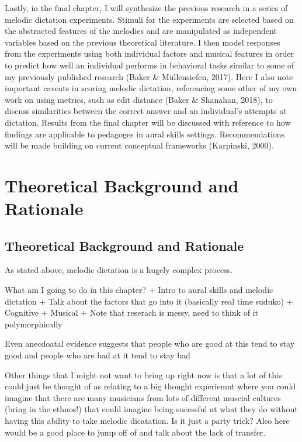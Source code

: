 \documentclass[]{book}
\theoremstyle{definition}
\theoremstyle{definition}
\theoremstyle{definition}
\theoremstyle{remark}
\begin{document}
Lastly, in the final chapter, I will synthesize the previous research in
a series of melodic dictation experiments. Stimuli for the experiments
are selected based on the abstracted features of the melodies and are
manipulated as independent variables based on the previous theoretical
literature. I then model responses from the experiments using both
individual factors and musical features in order to predict how well an
individual performs in behavioral tasks similar to some of my previously
published research (Baker \& Müllensiefen, 2017). Here I also note
important caveats in scoring melodic dictation, referencing some other
of my own work on using metrics, such as edit distance (Baker \&
Shanahan, 2018), to discuss similarities between the correct answer and
an individual's attempts at dictation. Results from the final chapter
will be discussed with reference to how findings are applicable to
pedagoges in aural skills settings. Recommendations will be made
building on current conceptual frameworks (Karpinski, 2000).

\hypertarget{intro}{%
\chapter{Theoretical Background and Rationale}\label{intro}}

\hypertarget{theoretical-background-and-rationale}{%
\section{Theoretical Background and
Rationale}\label{theoretical-background-and-rationale}}

As stated above, melodic dictation is a hugely complex process.

What am I going to do in this chapter? + Intro to aural skills and
melodic dictation + Talk about the factors that go into it (basically
real time suduko) + Cognitive + Musical + Note that reserach is messy,
need to think of it polymorphically

Even anecdoatal evidence suggests that people who are good at this tend
to stay good and people who are bad at it tend to stay bad

Other things that I might not want to bring up right now is that a lot
of this could just be thought of as relating to a big thought experiemnt
where you could imagine that there are many musicians from lots of
different muscial cultures (bring in the ethnos!) that could imagine
being sucessful at what they do without having this ability to take
melodic dicatation. Is it just a party trick? Also here would be a good
place to jump off of and talk about the lack of transfer.
\end{document}
